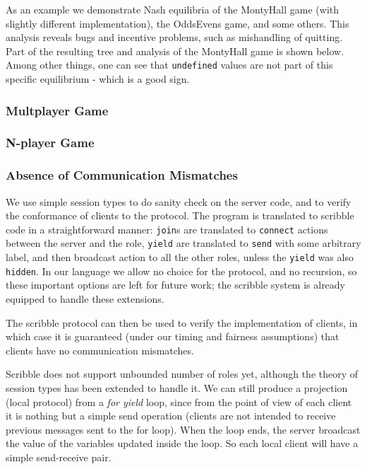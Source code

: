 \documentclass[acmsmall,review,anonymous]{acmart}\settopmatter{printfolios=true,printccs=false,printacmref=false}
\begin{document}
As an example we demonstrate Nash equilibria of the MontyHall game (with slightly different implementation), the OddsEvens game, and some others. This analysis reveals bugs and incentive problems, such as mishandling of quitting. Part of the resulting tree and analysis of the MontyHall game is shown below. Among other things, one can see that \texttt{undefined} values are not part of this specific equilibrium - which is a good sign.

\subsubsection{Multplayer Game}

\subsubsection{N-player Game}


\subsubsection{Absence of Communication Mismatches}
We use simple session types to do sanity check on the server code, and to verify the conformance of clients to the protocol. The program is translated to scribble code in a straightforward manner: \texttt{join}s are translated to \texttt{connect} actions between the server and the role, \texttt{yield} are translated to \texttt{send} with some arbitrary label, and then broadcast action to all the other roles, unless the \texttt{yield} was also \texttt{hidden}. In our language we allow no choice for the protocol, and no recursion, so these important options are left for future work; the scribble system is already equipped to handle these extensions.

The scribble protocol can then be used to verify the implementation of clients, in which case it is guaranteed (under our timing and fairness assumptions) that clients have no communication mismatches.

Scribble does not support unbounded number of roles yet, although the theory of session types has been extended to handle it. We can still produce a projection (local protocol) from a \textit{for yield} loop, since from the point of view of each client it is nothing but a simple send operation (clients are not intended to receive previous messages sent to the for loop). When the loop ends, the server broadcast the value of the variables updated inside the loop. So each local client will have a simple send-receive pair.
\end{document}
